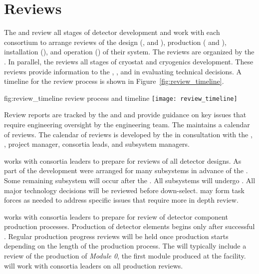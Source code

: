 \chapter{Reviews}
\label{vl:tc-review}

The  and  review all stages of detector development
and work with each consortium to arrange reviews of the design
(,  and ), production (
and ), installation (), and operation
() of their system. The reviews are organized by the
 . In parallel, the   reviews all
stages of  cryostat and cryogenics development.  These
reviews provide information to the , , and 
in evaluating technical decisions. A timeline for the review process
is shown in Figure~\ref{fig:review_timeline}.
\begin{dunefigure}{fig:review_timeline}
  { review process and timeline}
  \texttt{[image: review\_timeline]}
\end{dunefigure}
Review reports are tracked by the   and  and provide
guidance on key issues that require engineering oversight by the
 engineering team. The   maintains a
calendar of  reviews. The calendar of reviews is developed
by the   in consultation with the ,
,  project manager, consortia leads, and
 subsystem managers.

 works with consortia leaders to prepare for reviews of all detector
designs.  As part of the  development  were
arranged for many subsystems in advance of the . Some
remaining subsystem  will occur after the . All
subsystems will undergo .  All major technology decisions
will be reviewed before down-select.   may form task forces
as needed to address specific issues that require more in depth
review.


 works with consortia leaders to prepare for review of
detector component production processes.  Production of detector
elements begins only after successful . Regular production
progress reviews will be held once production starts depending on the
length of the production process. The  will typically
include a review of the production of \textit{Module 0}, the first
module produced at the facility.  will work with consortia
leaders on all production reviews.

